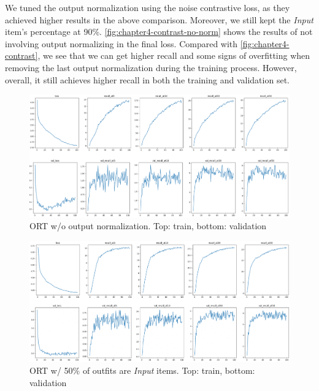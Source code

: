 We tuned the output normalization using the noise contrastive loss, as they achieved higher results in the above comparison. Moreover, we still kept the \textit{Input} item's percentage at 90\%. \autoref{fig:chapter4-contrast-no-norm} shows the results of not involving output normalizing in the final loss. Compared with \autoref{fig:chapter4-contrast}, we see that we can get higher recall and some signs of overfitting when removing the last output normalization during the training process. However, overall, it still achieves higher recall in both the training and validation set.

\begin{figure}[ht!]
    \centering
\includegraphics[width=\linewidth]{content/resources/images/fashion-recommendation/chapter4-contrast-no-norm.png}
    \caption{ORT w/o output normalization. Top: train, bottom: validation}
    \label{fig:chapter4-contrast-no-norm}
\end{figure}

\begin{figure}[ht!]
    \centering
\includegraphics[width=\linewidth]{content/resources/images/fashion-recommendation/chapter4-contrast-no-norm-mask-half.png}
    \caption{ORT w/ 50\% of outfits are \textit{Input} items. Top: train, bottom: validation}
    \label{fig:chapter4-contrast-no-norm-mask-half}
\end{figure}

